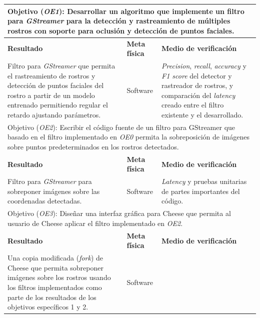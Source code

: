 \documentclass[a4paper,openright,12pt]{report}
\begin{document}
\begin{center}
  \begin{longtable}{| p{.4\linewidth} | p{.2\linewidth} | p{.3\linewidth} |}
  \hline

  \multicolumn{3}{|p{\linewidth}|}{Objetivo (\textit{OE1}): Desarrollar un algoritmo que
  implemente un filtro para \textit{GStreamer} para la detección y rastreamiento
  de múltiples rostros con soporte para oclusión y detección de puntos faciales.}
  \\ \hline

  \textbf{Resultado} &
  \textbf{Meta física} &
  \textbf{Medio de verificación}
  \\ \hline

  Filtro para \textit{GStreamer} que permita el rastreamiento de rostros y
  detección de puntos faciales del rostro a partir de un modelo entrenado 
  permitiendo regular el retardo ajustando parámetros. &
  Software &
  \textit{Precision}, \textit{recall}, \textit{accuracy} y
  \textit{F1 score} del detector y rastreador de rostros, y comparación del
  \textit{latency} creado entre el filtro existente y el desarrollado.
  \\ \hline

  \multicolumn{3}{|p{\linewidth}|}{Objetivo (\textit{OE2}): Escribir el código
  fuente de un filtro para GStreamer que basado en el filtro implementado en
  \textit{OE0} permita la sobreposición de imágenes sobre puntos predeterminados
  en los rostros detectados.}
  \\ \hline

  \textbf{Resultado} &
  \textbf{Meta física} &
  \textbf{Medio de verificación}
  \\ \hline

  Filtro para \textit{GStreamer} para sobreponer imágenes sobre las coordenadas
  detectadas. &
  Software &
  \textit{Latency} y pruebas unitarias de partes importantes del código.
  \\ \hline

  \multicolumn{3}{|p{\linewidth}|}{Objetivo (\textit{OE3}): Diseñar una interfaz
  gráfica para Cheese que permita al usuario de Cheese aplicar el filtro
  implementado en \textit{OE2}.}
  \\ \hline

  \textbf{Resultado} &
  \textbf{Meta física} &
  \textbf{Medio de verificación}
  \\ \hline

  Una copia modificada (\textit{fork}) de Cheese que permita sobreponer imágenes
  sobre los rostros usando los filtros implementados como parte de los
  resultados de los objetivos específicos 1 y 2. &
  Software &
  \\ \hline
  \end{longtable}
\end{center}
\end{document}
